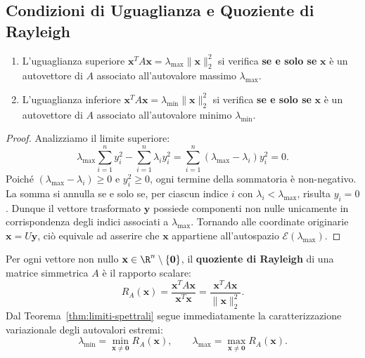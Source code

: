 \subsection{Condizioni di Uguaglianza e Quoziente di Rayleigh}

\begin{property}
\mbox{}\par\nopagebreak
\begin{enumerate}
    \item L'uguaglianza superiore $\mathbf{x}^T A \mathbf{x} = \lambda_{\max} \|\mathbf{x}\|_2^2$ si verifica \textbf{se e solo se} $\mathbf{x}$ \`e un autovettore di $A$ associato all'autovalore massimo $\lambda_{\max}$.
    \item L'uguaglianza inferiore $\mathbf{x}^T A \mathbf{x} = \lambda_{\min} \|\mathbf{x}\|_2^2$ si verifica \textbf{se e solo se} $\mathbf{x}$ \`e un autovettore di $A$ associato all'autovalore minimo $\lambda_{\min}$.
\end{enumerate}
\end{property}

\begin{proof}
Analizziamo il limite superiore:
\begin{equation}
    \lambda_{\max} \sum_{i=1}^n y_i^2 - \sum_{i=1}^n \lambda_i y_i^2 = \sum_{i=1}^n (\lambda_{\max} - \lambda_i) y_i^2 = 0.
\end{equation}
Poich\'e $(\lambda_{\max} - \lambda_i) \ge 0$ e $y_i^2 \ge 0$, ogni termine della sommatoria \`e non-negativo. La somma si annulla se e solo se, per ciascun indice $i$ con $\lambda_i < \lambda_{\max}$, risulta $y_i = 0$. Dunque il vettore trasformato $\mathbf{y}$ possiede componenti non nulle unicamente in corrispondenza degli indici associati a $\lambda_{\max}$. Tornando alle coordinate originarie $\mathbf{x} = U \mathbf{y}$, ci\`o equivale ad asserire che $\mathbf{x}$ appartiene all'autospazio $\mathcal{E}(\lambda_{\max})$.
\end{proof}

\begin{definition}
Per ogni vettore non nullo $\mathbf{x} \in \R^n \setminus \{\mathbf{0}\}$, il \textbf{quoziente di Rayleigh} di una matrice simmetrica $A$ \`e il rapporto scalare:
\begin{equation}
    R_A(\mathbf{x}) = \frac{\mathbf{x}^T A \mathbf{x}}{\mathbf{x}^T \mathbf{x}} = \frac{\mathbf{x}^T A \mathbf{x}}{\|\mathbf{x}\|_2^2}.
\end{equation}
Dal Teorema~\ref{thm:limiti-spettrali} segue immediatamente la caratterizzazione variazionale degli autovalori estremi:
\begin{equation}
    \lambda_{\min} = \min_{\mathbf{x} \neq \mathbf{0}} R_A(\mathbf{x}), \qquad \lambda_{\max} = \max_{\mathbf{x} \neq \mathbf{0}} R_A(\mathbf{x}).
\end{equation}
\end{definition}

